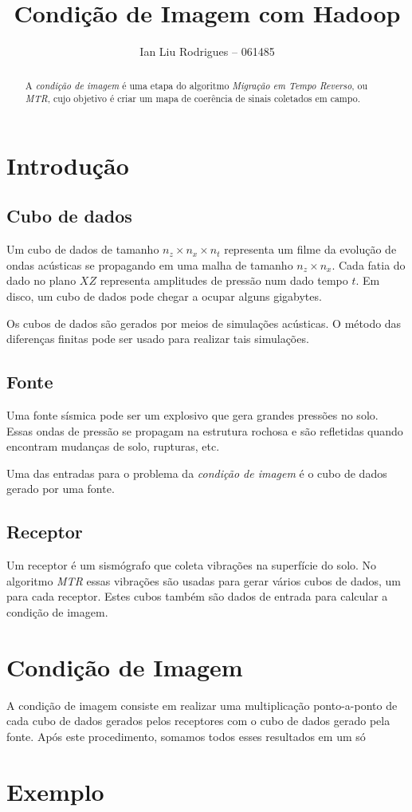 \documentclass[a4paper,12pt]{article}
\begin{document}
\title{Condição de Imagem com Hadoop}
\author{Ian Liu Rodrigues -- 061485}
\maketitle

\begin{abstract}
  A \emph{condição de imagem} é uma etapa do algoritmo \emph{Migração em
  Tempo Reverso}, ou \emph{MTR}, cujo objetivo é criar um mapa de
  coerência de sinais coletados em campo.
\end{abstract}

\section{Introdução}

\subsection{Cubo de dados}

Um cubo de dados de tamanho $n_z \times n_x \times n_t$ representa um
filme da evolução de ondas acústicas se propagando em uma malha de
tamanho $n_z \times n_x$. Cada fatia do dado no plano $XZ$ representa
amplitudes de pressão num dado tempo $t$. Em disco, um cubo de dados
pode chegar a ocupar alguns gigabytes.

Os cubos de dados são gerados por meios de simulações acústicas. O
método das diferenças finitas pode ser usado para realizar tais
simulações.

\subsection{Fonte}

Uma fonte sísmica pode ser um explosivo que gera grandes pressões no
solo. Essas ondas de pressão se propagam na estrutura rochosa e são
refletidas quando encontram mudanças de solo, rupturas, etc.

Uma das entradas para o problema da \emph{condição de imagem} é o cubo
de dados gerado por uma fonte.

\subsection{Receptor}

Um receptor é um sismógrafo que coleta vibrações na superfície do solo.
No algoritmo \emph{MTR} essas vibrações são usadas para gerar vários
cubos de dados, um para cada receptor. Estes cubos também são dados de
entrada para calcular a condição de imagem.

\section{Condição de Imagem}

A condição de imagem consiste em realizar uma multiplicação
ponto-a-ponto de cada cubo de dados gerados pelos receptores com o cubo
de dados gerado pela fonte. Após este procedimento, somamos todos esses
resultados em um só

\section{Exemplo}
\end{document}

